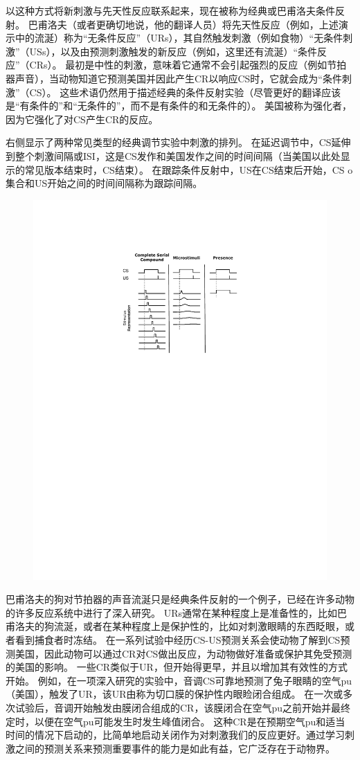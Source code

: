 以这种方式将新刺激与先天性反应联系起来，现在被称为经典或巴甫洛夫条件反射。
巴甫洛夫（或者更确切地说，他的翻译人员）将先天性反应（例如，上述演示中的流涎）称为“无条件反应”（URs），其自然触发刺激（例如食物）“无条件刺激”（USs），以及由预测刺激触发的新反应（例如，这里还有流涎）“条件反应”（CRs）。
最初是中性的刺激，意味着它通常不会引起强烈的反应（例如节拍器声音），当动物知道它预测美国并因此产生CR以响应CS时，它就会成为“条件刺激”（CS）。
这些术语仍然用于描述经典的条件反射实验（尽管更好的翻译应该是“有条件的”和“无条件的”，而不是有条件的和无条件的）。
美国被称为强化者，因为它强化了对CS产生CR的反应。


右侧显示了两种常见类型的经典调节实验中刺激的排列。
在延迟调节中，CS延伸到整个刺激间隔或ISI，这是CS发作和美国发作之间的时间间隔（当美国以此处显示的常见版本结束时，CS结束）。
在跟踪条件反射中，US在CS结束后开始，CS o集合和US开始之间的时间间隔称为跟踪间隔。


\begin{figure}[!htb]
	\centering
	\includegraphics[width=0.5\linewidth]{chap11/fig_11_1}
	\caption{  \label{fig:11_1}}
\end{figure}


巴甫洛夫的狗对节拍器的声音流涎只是经典条件反射的一个例子，已经在许多动物的许多反应系统中进行了深入研究。
URs通常在某种程度上是准备性的，比如巴甫洛夫的狗流涎，或者在某种程度上是保护性的，比如对刺激眼睛的东西眨眼，或者看到捕食者时冻结。
在一系列试验中经历CS-US预测关系会使动物了解到CS预测美国，因此动物可以通过CR对CS做出反应，为动物做好准备或保护其免受预测的美国的影响。
一些CR类似于UR，但开始得更早，并且以增加其有效性的方式开始。
例如，在一项深入研究的实验中，音调CS可靠地预测了兔子眼睛的空气pu（美国），触发了UR，该UR由称为切口膜的保护性内眼睑闭合组成。
在一次或多次试验后，音调开始触发由膜闭合组成的CR，该膜闭合在空气pu之前开始并最终定时，以便在空气pu可能发生时发生峰值闭合。
这种CR是在预期空气pu和适当时间的情况下启动的，比简单地启动关闭作为对刺激我们的反应更好。通过学习刺激之间的预测关系来预测重要事件的能力是如此有益，它广泛存在于动物界。





